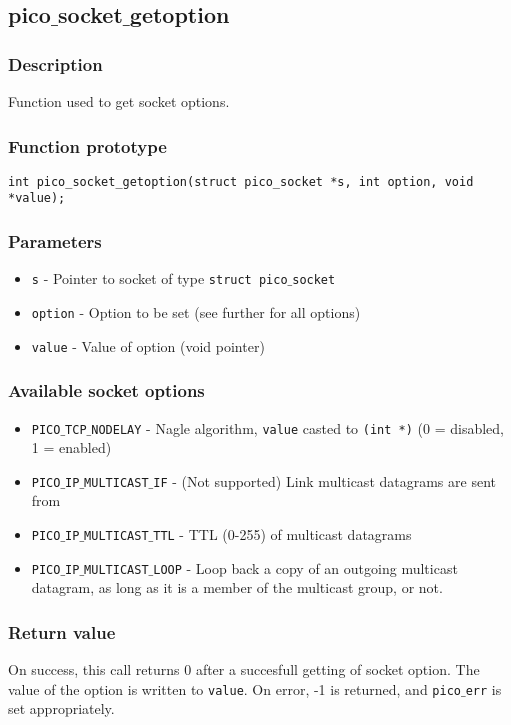 \subsection{pico$\_$socket$\_$getoption}

\subsubsection*{Description}
Function used to get socket options.

\subsubsection*{Function prototype}
\begin{verbatim}
int pico_socket_getoption(struct pico_socket *s, int option, void *value);
\end{verbatim}

\subsubsection*{Parameters}
\begin{itemize}[noitemsep]
\item \texttt{s} - Pointer to socket of type \texttt{struct pico$\_$socket}
\item \texttt{option} - Option to be set (see further for all options)
\item \texttt{value} - Value of option (void pointer)
\end{itemize}

\subsubsection*{Available socket options}
\begin{itemize}[noitemsep]
\item \texttt{PICO$\_$TCP$\_$NODELAY} - Nagle algorithm, \texttt{value} casted to \texttt{(int *)} (0 = disabled, 1 = enabled)
\item \texttt{PICO$\_$IP$\_$MULTICAST$\_$IF} - (Not supported) Link multicast datagrams are sent from
\item \texttt{PICO$\_$IP$\_$MULTICAST$\_$TTL} - TTL (0-255) of multicast datagrams
\item \texttt{PICO$\_$IP$\_$MULTICAST$\_$LOOP} - Loop back a copy of an outgoing multicast datagram, as long as it is a member of the multicast group, or not.
\end{itemize}

\subsubsection*{Return value}
On success, this call returns 0 after a succesfull getting of socket option. The value of
the option is written to \texttt{value}.
On error, -1 is returned, and \texttt{pico$\_$err} is set appropriately.

